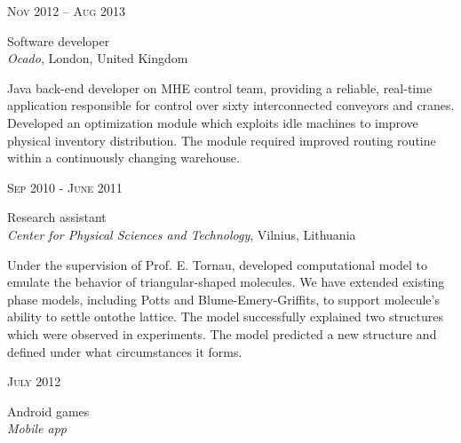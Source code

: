 \documentclass[10pt]{article} %
\begin{document}
{\begin{minipage}[t]{0.5\textwidth}

{\raggedleft\textsc{Nov 2012 – Aug 2013}\par}

{\raggedright\large Software developer\\
\textit{Ocado}, London, United Kingdom\\[5pt]}

\normalsize{Java back-end developer on MHE control team,
providing a reliable, real-time application responsible for
control over sixty interconnected conveyors and cranes.
Developed an optimization module which exploits idle machines
to improve physical inventory distribution.
The module required improved routing routine within a continuously changing warehouse.}\\


\vspace{0.5cm}
{\raggedleft\textsc{Sep 2010 - June 2011}\par}

{\raggedright\large Research assistant\\
\textit{Center for Physical Sciences and Technology}, Vilnius, Lithuania\\[5pt]}

\normalsize{Under the supervision of Prof. E. Tornau,
 developed computational model to emulate the behavior
of triangular-shaped molecules. We have extended existing
phase models, including Potts and Blume-Emery-Griffits,
to support molecule's ability to settle ontothe lattice.
The model successfully explained two structures which were observed in experiments.
The model predicted a new structure and defined under what circumstances it forms.}\\



\vspace{0.5cm}
{\raggedleft\textsc{July 2012}\par}

{\raggedright\large Android games\\
\textit{Mobile app}\\[5pt]}


\end{minipage}}
\end{document}
